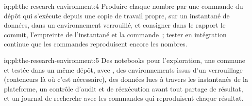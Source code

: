 \begin{solution}{iq:pl:the-research-environment:4}
Produire chaque nombre par une commande du dépôt qui s'exécute depuis une copie de travail propre, sur un instantané de données, dans un environnement verrouillé, et consigner dans le
rapport le commit, l'empreinte de l'instantané et la commande~; tester en intégration continue que les commandes reproduisent encore les nombres.
\end{solution}

\begin{solution}{iq:pl:the-research-environment:5}
Des notebooks pour l'exploration, une  commune et testée dans un même dépôt, avec , des environnements issus d'un verrouillage (conteneurs là où c'est nécessaire),
des données lues à travers les instantanés de la plateforme, un contrôle d'audit et de réexécution avant tout partage de résultat, et un journal de recherche avec les commandes qui
reproduisent chaque résultat.
\end{solution}
